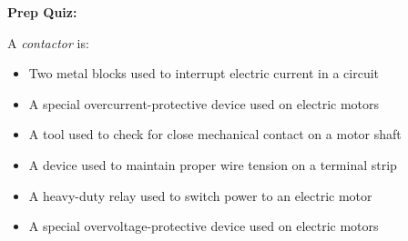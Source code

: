 \vfil \eject

\noindent
{\bf Prep Quiz:}

A {\it contactor} is:

\begin{itemize}
\item{} Two metal blocks used to interrupt electric current in a circuit
\vskip 5pt 
\item{} A special overcurrent-protective device used on electric motors
\vskip 5pt 
\item{} A tool used to check for close mechanical contact on a motor shaft
\vskip 5pt 
\item{} A device used to maintain proper wire tension on a terminal strip
\vskip 5pt 
\item{} A heavy-duty relay used to switch power to an electric motor
\vskip 5pt 
\item{} A special overvoltage-protective device used on electric motors
\end{itemize}



